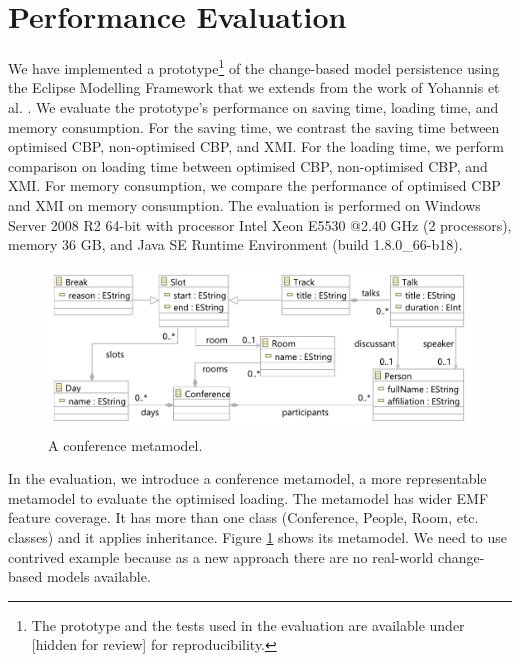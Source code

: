 \documentclass{llncs}
\begin{document}


\section{Performance Evaluation}
\label{sec:performance_evaluation}
We have implemented a prototype\footnote{The prototype and the tests used in the evaluation are available under [hidden for review] for reproducibility. %
} of the change-based model persistence using the Eclipse Modelling Framework that we extends from the work of Yohannis et al. \cite{yohannis2017turning}. We evaluate the prototype's performance on saving time, loading time, and memory consumption. For the saving time, we contrast the saving time between optimised CBP, non-optimised CBP, and XMI. For the loading time, we perform comparison on loading time between optimised CBP, non-optimised CBP, and XMI. For memory consumption, we compare the performance of optimised CBP and XMI on memory consumption. The evaluation is performed on Windows Server 2008 R2 64-bit with processor Intel Xeon E5530 @2.40 GHz (2 processors), memory 36 GB, and Java SE Runtime Environment (build 1.8.0\_66-b18).

\begin{figure}[htbp]
    \centering
    \includegraphics[width=0.9\linewidth]{conference_metamodel}
    \caption{A conference metamodel.}   
    \label{fig:node_metamodel}
\end{figure}

In the evaluation, we introduce a conference metamodel, a more representable metamodel to evaluate the optimised loading. The metamodel has wider EMF feature coverage. It has more than one class (Conference, People, Room, etc. classes) and it applies inheritance. Figure \ref{fig:node_metamodel} shows its metamodel. We need to use contrived example because as a new approach there are no real-world change-based models available. 
\end{document}
